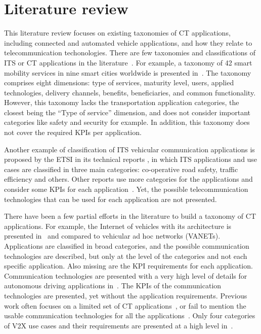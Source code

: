 \section{Literature review}
This literature review focuses on existing taxonomies of \acrshort{CT} applications, including connected and automated vehicle applications, and how they relate to telecommunication techonologies. 
There are few taxonomies and classifications of \acrshort{ITS} or \acrshort{CT} applications in the literature~\cite{chang_estimated_2015}. For example, a taxonomy of 42 smart mobility services in nine smart cities worldwide is presented in~\cite{cledou_taxonomy_2018}. The taxonomy comprises eight dimensions: type of services, maturity level, users, applied technologies, delivery channels, benefits, beneficiaries, and common functionality. 
However, this taxonomy lacks the transportation application categories, the closest being the ``Type of service'' dimension, and does not consider important categories like safety and security for example. In addition, this taxonomy does not cover the required \acrshort{KPI}s per application. 

Another example of classification of \acrshort{ITS} vehicular communication applications is proposed by the \acrfull{ETSI} in its technical reports \cite{etsi_etsi_tr_102_638_intelligent_2009,etsi_tr_102_863_intelligent_2011}, in which \acrshort{ITS} applications and use cases are classified in three main categories: co-operative road safety, traffic efficiency and others. Other reports use more categories for the applications and consider some \acrshort{KPI}s for each application~\cite{hamida_security_2015,papadimitratos_vehicular_2009,3gpp_tr_22886_3rd_2018,al-sultan_comprehensive_2014}. Yet, the possible telecommunication technologies that can be used for each application are not presented.

There have been a few partial efforts in the literature to build a taxonomy of \acrshort{CT} applications. For example, the Internet of vehicles with its architecture is presented in~\cite{kaiwartya_internet_2016} and compared to vehicular ad hoc networks (VANETs). Applications are classified in broad categories, and the possible communication technologies are described, but only at the level of the categories and not each specific application. Also missing are the \acrshort{KPI} requirements for each application. Communication technologies are presented with a very high level of details for autonomous driving applications in~\cite{wang_networking_2019}. The \acrshort{KPI}s of the communication technologies are presented, yet without the application requirements. 
Previous work often focuses on a limited set of \acrshort{CT} applications~\cite{lee_latency_2017}, or fail to mention the usable communication technologies for all the applications~\cite{raza_social_2018,karagiannis_vehicular_2011}. Only four categories of V2X use cases and their requirements are presented at a high level in~\cite{machardy_v2x_2018}. 

